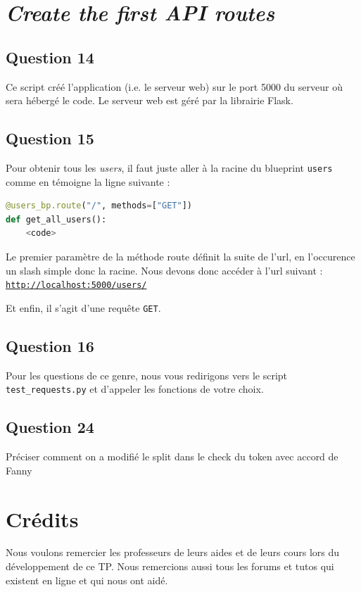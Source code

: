 \documentclass[light]{ceri/sty/rapport}
\begin{document}
\section{\textit{Create the first API routes}}
\subsection{Question 14}
Ce script créé l'application (i.e. le serveur web) sur le port 5000 du serveur où sera hébergé le code. Le serveur web est géré par la librairie Flask.

\subsection{Question 15}
Pour obtenir tous les \textit{users}, il faut juste aller à la racine du blueprint \texttt{users} comme en témoigne la ligne suivante :

\begin{lstlisting}[language=python]
@users_bp.route("/", methods=["GET"])
def get_all_users():
    <code>
\end{lstlisting}

Le premier paramètre de la méthode route définit la suite de l'url, en l'occurence un slash simple donc la racine. Nous devons donc accéder à l'url suivant : \texttt{\url{http://localhost:5000/users/}}

Et enfin, il s'agit d'une requête \texttt{GET}.

\subsection{Question 16}
Pour les questions de ce genre, nous vous redirigons vers le script \texttt{test_requests.py} et d'appeler les fonctions de votre choix.



\subsection{Question 24}
Préciser comment on a modifié le split dans le check du token avec accord de Fanny

\section{Crédits}
Nous voulons remercier les professeurs de leurs aides et de leurs cours lors du développement de ce TP.
Nous remercions aussi tous les forums et tutos qui existent en ligne et qui nous ont aidé.
\end{document}
